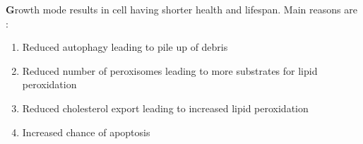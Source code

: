 \textbf Growth mode results in cell having shorter health and lifespan. Main reasons are :
\begin{enumerate}
\item Reduced autophagy leading to pile up of debris
\item Reduced number of peroxisomes leading to more substrates for lipid peroxidation
\item Reduced cholesterol export leading to increased lipid peroxidation
\item Increased chance of apoptosis
\end{enumerate}